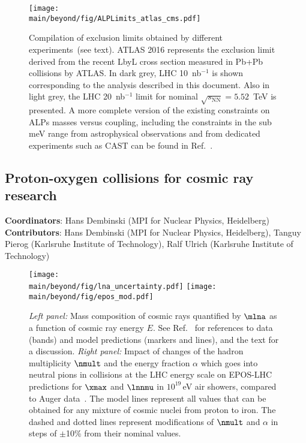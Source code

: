 \documentclass[../report.tex]{subfiles}
\providecommand{\main}{..}
\begin{document}
\begin{figure}[!htbp]
\centering
  \texttt{[image: \\main/beyond/fig/ALPLimits\_atlas\_cms.pdf]}
  \caption{Compilation of exclusion limits obtained by different experiments~(see text).
  ATLAS 2016 represents the exclusion limit derived from the recent LbyL cross section measured in Pb+Pb collisions by ATLAS.
  In dark grey, LHC 10~nb$^{-1}$ is shown corresponding to the analysis described in this document. Also in light grey, the LHC 20~nb$^{-1}$ limit for nominal $\sqrt{s_{\mathrm{NN}}}=5.52$~TeV is presented. A more complete version of the existing constraints on ALPs masses versus coupling, including the
  constraints in the sub meV range from astrophysical observations and
  from dedicated experiments such as CAST can be found in Ref.~\cite{Bauer:2017ris}.}
  \label{fig:alp-lambda-limits}
\end{figure}

\subsection{Proton-oxygen collisions for cosmic ray research}
\label{sec:pOcosmic}
\textbf{Coordinators}: Hans Dembinski (MPI for Nuclear Physics, Heidelberg)
 \textbf{Contributors}: Hans Dembinski (MPI for Nuclear Physics, Heidelberg), Tanguy Pierog (Karlsruhe Institute of Technology), Ralf Ulrich (Karlsruhe Institute of Technology)


\begin{figure}
\texttt{[image: \\main/beyond/fig/lna\_uncertainty.pdf]}
\texttt{[image: \\main/beyond/fig/epos\_mod.pdf]}
\caption{\emph{Left panel:} Mass composition of cosmic rays quantified by $\mlna$ as a function of cosmic ray energy $E$. See Ref.~\cite{kampert_cr_review} for references to data (bands) and model predictions (markers and lines), and the text for a discussion. \emph{Right panel:} Impact of changes of the hadron multiplicity $\nmult$ and the energy fraction $\alpha$ which goes into neutral pions in collisions at the LHC energy scale on EPOS-LHC predictions for $\xmax$ and $\lnnmu$ in $10^{19}$\,\si{eV} air showers, compared to Auger data~\cite{Aab:2014pza}. The model lines represent all values that can be obtained for any mixture of cosmic nuclei from proton to iron. The dashed and dotted lines represent modifications of $\nmult$ and $\alpha$ in steps of $\pm$10\% from their nominal values.}
\label{fig:cosmic_rays}
\end{figure}
\end{document}
